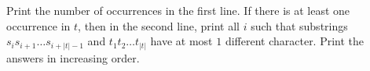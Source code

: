 Print the number of occurrences in the first line.
If there is at least one occurrence in $t$, then in the second line, print all $i$ such that substrings $s_is_{i+1}\ldots s_{i+|t|-1}$ and $t_1t_2\ldots t_{|t|}$ have at most $1$ different character.
Print the answers in increasing order.